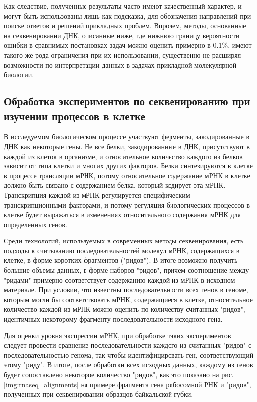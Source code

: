 Как следствие, полученные результаты часто имеют качественный характер, и могут быть использованы лишь как подсказка, для обозначения направлений при поиске ответов и решений прикладных проблем. Впрочем, методы, основанные на секвенировании ДНК, описанные ниже, где нижнюю границу вероятности ошибки в сравнимых постановках задач можно оценить примерно в 0.1\%, имеют такого же рода ограничения при их использовании, существенно не расширяя возможности по интерпретации данных в задачах прикладной молекулярной биологии.

\subsection{Обработка экспериментов по секвенированию при изучении процессов в клетке}

В исследуемом биологическом процессе участвуют ферменты, закодированные в ДНК как некоторые гены. Не все белки, закодированные в ДНК, присутствуют в каждой из клеток в организме, и относительное количество каждого из белков зависит от типа клетки и многих других факторов. Белки синтезируются в клетке в процессе трансляции мРНК, потому относительное содержание мРНК в клетке должно быть связано с содержанием белка, который кодирует эта мРНК. Транскрипция каждой из мРНК регулируется специфическим транскрипционными факторами, и потому регуляция биологических процессов в клетке будет выражаться в изменениях относительного содержания мРНК для определенных генов. 

Среди технологий, используемых в современных методы секвенирования, есть подходы к считыванию последовательностей молекул мРНК, содержащихся в клетке, в форме коротких фрагментов ("ридов"). В итоге возможно получить большие объемы данных, в форме наборов "ридов", причем соотношение между "ридами" примерно соответствует содержанию каждой из мРНК в исходном материале. При условии, что известны последовательности всех генов в геноме, которым могли бы соответствовать мРНК, содержащиеся в клетке, относительное количество каждой из мРНК можно оценить по количеству считанных "ридов", идентичных некоторому фрагменту последовательности исходного гена.

Для оценки уровня экспрессии мРНК, при обработке таких экспериментов следует провести сравнение последовательности каждого из считанных "ридов" с последовательностью генома, так чтобы идентифицировать ген, соответствующий этому "риду". В итоге, после обработки всех исходных данных, каждому из генов будет сопоставлено некоторое количество "ридов", как это показано на рис.\ref{img:rnaseq_alignments} на примере фрагмента гена рибосомной РНК и "ридов", полученных при секвенировании образцов байкальской губки.

